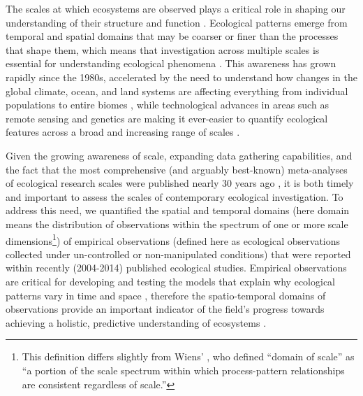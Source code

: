 \documentclass[12pt]{article}
\begin{document}
\linenumbers
\vspace{10pt}
The scales at which ecosystems are observed plays a critical role in shaping our understanding of their structure and function \cite{levin_problem_1992,chave_problem_2013,wiens_spatial_1989}.  Ecological patterns emerge from temporal and spatial domains that may be coarser or finer than the processes that shape them, which means that investigation across multiple scales is essential for understanding ecological phenomena \cite{levin_problem_1992}. This awareness has grown rapidly since the 1980s, accelerated by the need to understand how changes in the global climate, ocean, and land systems are affecting everything from individual populations \cite{tingley_push_2012} to entire biomes \cite{xiao_photosynthetic_2004}, while technological advances in areas such as remote sensing and genetics are making it ever-easier to quantify ecological features across a broad and increasing range of scales \cite{schneider_rise_2001, chave_problem_2013}.  

Given the growing awareness of scale, expanding data gathering capabilities, and the fact that the most comprehensive (and arguably best-known) meta-analyses of ecological research scales were published nearly 30 years ago \cite{tilman_ecological_1989,kareiva_spatial_1988}, it is both timely and important to assess the scales of contemporary ecological investigation. To address this need, we quantified the spatial and temporal domains (here domain means the distribution of observations within the spectrum of one or more scale dimensions\footnote{This definition differs slightly from Wiens' \cite{wiens_spatial_1989}, who defined ``domain of scale'' as ``a portion of the scale spectrum within which process-pattern relationships are consistent regardless of scale.''}) of empirical observations (defined here as ecological observations collected under un-controlled or non-manipulated conditions) that were reported within recently (2004-2014) published ecological studies. Empirical observations are critical for developing and testing the models that explain why ecological patterns vary in time and space \cite{levin_problem_1992, tilman_ecological_1989}, therefore the spatio-temporal domains of observations provide an important indicator of the field's progress towards achieving a holistic, predictive understanding of ecosystems \cite{chave_problem_2013,levin_problem_1992}. 
\end{document}
